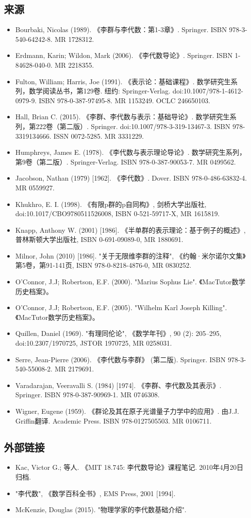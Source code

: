 \subsection{来源}  
\begin{itemize}
\item Bourbaki, Nicolas (1989). 《李群与李代数：第1-3章》. Springer. ISBN 978-3-540-64242-8. MR 1728312.  
\item Erdmann, Karin; Wildon, Mark (2006). 《李代数导论》. Springer. ISBN 1-84628-040-0. MR 2218355.  
\item Fulton, William; Harris, Joe (1991). 《表示论：基础课程》. 数学研究生系列，数学阅读丛书，第129卷. 纽约: Springer-Verlag. doi:10.1007/978-1-4612-0979-9. ISBN 978-0-387-97495-8. MR 1153249. OCLC 246650103.  
\item Hall, Brian C. (2015). 《李群、李代数与表示：基础导论》. 数学研究生系列，第222卷（第二版）. Springer. doi:10.1007/978-3-319-13467-3. ISBN 978-3319134666. ISSN 0072-5285. MR 3331229.  
\item Humphreys, James E. (1978). 《李代数与表示理论导论》. 数学研究生系列，第9卷（第二版）. Springer-Verlag. ISBN 978-0-387-90053-7. MR 0499562.
\item Jacobson, Nathan (1979) [1962]. 《李代数》. Dover. ISBN 978-0-486-63832-4. MR 0559927.  
\item Khukhro, E. I. (1998). 《有限p群的p自同构》, 剑桥大学出版社, doi:10.1017/CBO9780511526008, ISBN 0-521-59717-X, MR 1615819.  
\item Knapp, Anthony W. (2001) [1986]. 《半单群的表示理论：基于例子的概述》, 普林斯顿大学出版社, ISBN 0-691-09089-0, MR 1880691.  
\item Milnor, John (2010) [1986]. "关于无限维李群的注释", 《约翰·米尔诺尔文集》第5卷，第91-141页, ISBN 978-0-8218-4876-0, MR 0830252.  
\item O'Connor, J.J; Robertson, E.F. (2000). "Marius Sophus Lie". 《MacTutor数学历史档案》。
\item O'Connor, J.J; Robertson, E.F. (2005). "Wilhelm Karl Joseph Killing". 《MacTutor数学历史档案》。  
\item Quillen, Daniel (1969). "有理同伦论", 《数学年刊》, 90 (2): 205–295, doi:10.2307/1970725, JSTOR 1970725, MR 0258031.  
\item Serre, Jean-Pierre (2006). 《李代数与李群》 (第二版). Springer. ISBN 978-3-540-55008-2. MR 2179691.  
\item Varadarajan, Veeravalli S. (1984) [1974]. 《李群、李代数及其表示》. Springer. ISBN 978-0-387-90969-1. MR 0746308.  
\item Wigner, Eugene (1959). 《群论及其在原子光谱量子力学中的应用》. 由J.J. Griffin翻译. Academic Press. ISBN 978-0127505503. MR 0106711.
\end{itemize}
\subsection{外部链接}  
\begin{itemize}
\item Kac, Victor G.; 等人. 《MIT 18.745: 李代数导论》课程笔记. 2010年4月20日归档.  
\item "李代数", 《数学百科全书》, EMS Press, 2001 [1994].  
\item McKenzie, Douglas (2015). "物理学家的李代数基础介绍".
\end{itemize}